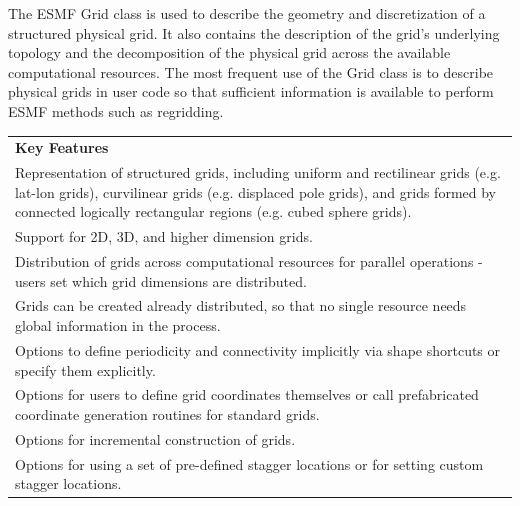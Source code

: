 %

The ESMF Grid class is used to describe the geometry and discretization
of a structured physical grid.  It also contains the description of the
grid's underlying topology and the decomposition of the physical grid
across the available computational resources.  The most frequent 
use of the Grid class is to describe physical grids in user
code so that sufficient information is available to perform ESMF
methods such as regridding. 

\begin{center}
\begin{tabular}{|p{6in}|}
\hline
\vspace{.01in}
{\bf Key Features} \\[.01in]
Representation of structured grids, including uniform and
rectilinear grids (e.g. lat-lon grids), curvilinear grids (e.g. displaced pole grids), 
and grids formed by connected logically rectangular regions (e.g. cubed
sphere grids).\\
Support for 2D, 3D, and higher dimension grids.\\ 
Distribution of grids across computational resources for parallel
operations - users set which grid dimensions are distributed.\\
Grids can be created already distributed, so that no single
resource needs global information in the process.\\
Options to define periodicity and connectivity implicitly via
shape shortcuts or specify them explicitly.\\ 
Options for users to define grid coordinates themselves or call
prefabricated coordinate generation routines for standard grids.\\
Options for incremental construction of grids.\\
Options for using a set of pre-defined stagger locations or for setting
custom stagger locations.\\[.03in] \hline
\end{tabular}
\end{center}

